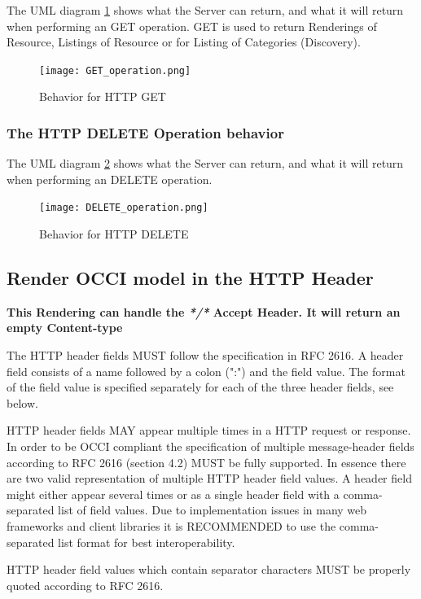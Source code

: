 \documentclass[10pt,a4paper]{article}
\begin{document}
The UML diagram \ref{fig:get_operation} shows what the Server can return, and what it will return when performing an GET operation. GET is used to return Renderings of Resource, Listings of Resource or for Listing of Categories (Discovery).

\begin{figure}[!h]
	\centering
	\texttt{[image: GET\_operation.png]}
	\caption{Behavior for HTTP GET}
	\label{fig:get_operation}
\end{figure}

\newpage
\subsubsection{The HTTP DELETE Operation behavior}

The UML diagram \ref{fig:del_operation} shows what the Server can return, and what it will return when performing an DELETE operation.

\begin{figure}[!h]
	\centering
	\texttt{[image: DELETE\_operation.png]}
	\caption{Behavior for HTTP DELETE}
	\label{fig:del_operation}
\end{figure}

\subsection{Render OCCI model in the HTTP Header}
\label{sec:http_header}

\textbf{This Rendering can handle the \textit{*/*} Accept Header. It will return an empty Content-type}

The HTTP header fields MUST follow the specification in RFC 2616. A header field consists of a name followed by a colon (":") and the field value. The format of the field value is specified separately for each of the three header fields, see below.

HTTP header fields MAY appear multiple times in a HTTP request or response. In order to be OCCI compliant the specification of multiple message-header fields according to RFC 2616 (section 4.2) MUST be fully supported. In essence there are two valid representation of multiple HTTP header field values. A header field might either appear several times or as a single header field with a comma-separated list of field values. Due to implementation issues in many web frameworks and client libraries it is RECOMMENDED to use the comma-separated list format for best interoperability.

HTTP header field values which contain separator characters MUST be properly quoted according to RFC 2616.
\end{document}
